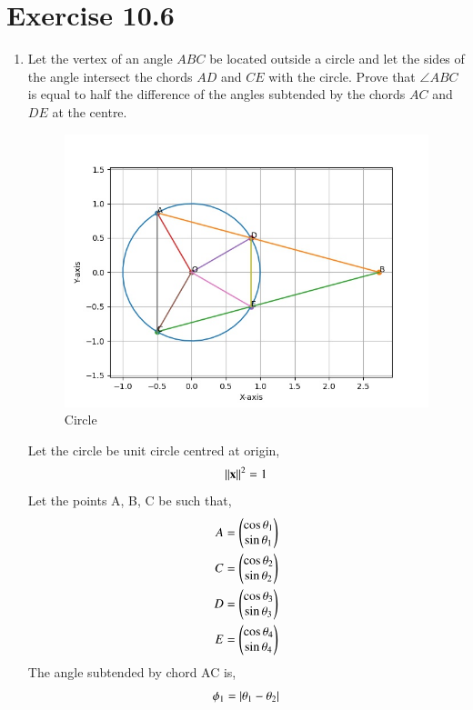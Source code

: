 \documentclass[journal,12pt,twocolumn]{IEEEtran}
\begin{document}
\section{Exercise 10.6}
\begin{enumerate}
	\item Let the vertex of an angle $ABC$ be located outside a circle and let the sides of the angle intersect the chords $AD$ and $CE$ with the circle. Prove that $\angle ABC$ is equal to half the difference of the angles subtended by the chords $AC$ and $DE$ at the centre.
	
\begin{figure}[ht]
	\centering
	\includegraphics[width = \columnwidth]{figs/plot.jpg}
	\caption{Circle}
	\label{fig:1}
\end{figure}

Let the circle be unit circle centred at origin,
		\begin{align}
			\left\lVert\mathbf{x}\right\rVert^2 = 1
		\end{align}
Let the points A, B, C be such that,
		\begin{align}
			A = \begin{pmatrix}\cos \theta_1\\\sin \theta_1\end{pmatrix}\\
			C = \begin{pmatrix}\cos \theta_2\\\sin \theta_2\end{pmatrix}\\
			D = \begin{pmatrix}\cos \theta_3\\\sin \theta_3\end{pmatrix}\\
			E = \begin{pmatrix}\cos \theta_4\\\sin \theta_4\end{pmatrix}
		\end{align}
The angle subtended by chord AC is,
		\begin{align}
			\phi_1 = \left\vert\theta_1-\theta_2\right\vert
		\end{align}


\end{enumerate}
\end{document}
